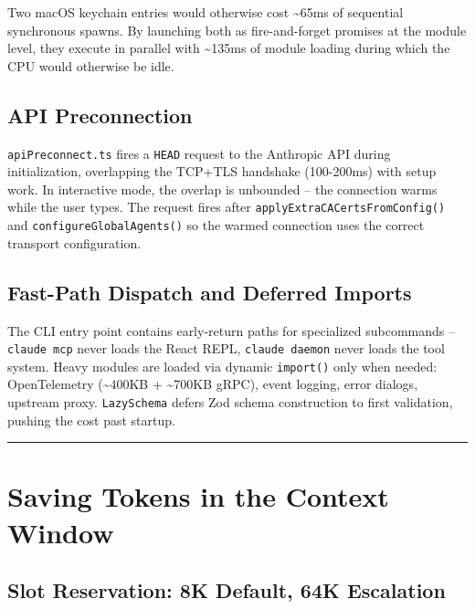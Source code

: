 \documentclass[
  english,
  11pt,
  letterpaper,
]{book}
\begin{document}
Two macOS keychain entries would otherwise cost \textasciitilde65ms of
sequential synchronous spawns. By launching both as fire-and-forget
promises at the module level, they execute in parallel with
\textasciitilde135ms of module loading during which the CPU would
otherwise be idle.

\subsection{API Preconnection}\label{api-preconnection}

\texttt{apiPreconnect.ts} fires a \texttt{HEAD} request to the Anthropic
API during initialization, overlapping the TCP+TLS handshake (100-200ms)
with setup work. In interactive mode, the overlap is unbounded -- the
connection warms while the user types. The request fires after
\texttt{applyExtraCACertsFromConfig()} and
\texttt{configureGlobalAgents()} so the warmed connection uses the
correct transport configuration.

\subsection{Fast-Path Dispatch and Deferred
Imports}\label{fast-path-dispatch-and-deferred-imports}

The CLI entry point contains early-return paths for specialized
subcommands -- \texttt{claude\ mcp} never loads the React REPL,
\texttt{claude\ daemon} never loads the tool system. Heavy modules are
loaded via dynamic \texttt{import()} only when needed: OpenTelemetry
(\textasciitilde400KB + \textasciitilde700KB gRPC), event logging, error
dialogs, upstream proxy. \texttt{LazySchema} defers Zod schema
construction to first validation, pushing the cost past startup.

\begin{center}\rule{0.5\linewidth}{0.5pt}\end{center}

\section{Saving Tokens in the Context
Window}\label{saving-tokens-in-the-context-window}

\subsection{Slot Reservation: 8K Default, 64K
Escalation}\label{slot-reservation-8k-default-64k-escalation}
\end{document}
